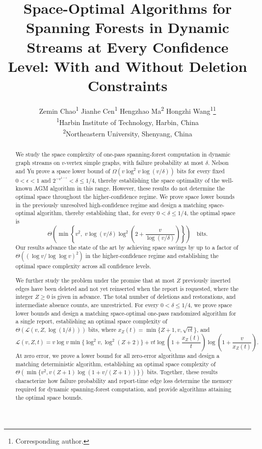 \documentclass[11pt,letterpaper]{article}
\title{Space-Optimal Algorithms for Spanning Forests in Dynamic Streams at Every Confidence Level: With and Without Deletion Constraints}
\author{%
  Zemin Chao\textsuperscript{1}\quad
  Jianhe Cen\textsuperscript{1}\quad
  Hengzhao Ma\textsuperscript{2}\quad
  Hongzhi Wang\textsuperscript{1}\thanks{Corresponding author.}\\[0.6em]
  \small\textsuperscript{1}Harbin Institute of Technology, Harbin, China\\
  \small\textsuperscript{2}Northeastern University, Shenyang, China}
\date{}
\numberwithin{equation}{section}
\begin{document}
\maketitle
\thispagestyle{empty}


\begin{abstract}
We study the space complexity of one-pass spanning-forest computation in dynamic graph streams on $v$-vertex simple graphs, with failure probability at most $\delta$.
Nelson and Yu prove a space lower bound of $\Omega(v\log^2 v\log(v/\delta))$ bits for every fixed
$0<\epsilon<1$ and $2^{-v^{1-\epsilon}}<\delta\le1/4$, thereby establishing the space optimality of the well-known AGM algorithm in this range.
However, these results do not determine the optimal space throughout the higher-confidence regime.
We prove space lower bounds in the previously unresolved high-confidence regime and design a matching space-optimal algorithm, thereby establishing that, for every $0<\delta\le1/4$, the optimal space is
\[
\Theta\!\left(
  \min\left\{
    v^2,\;
    v\log(v/\delta)
    \log^2\!\left(2+\frac{v}{\log(v/\delta)}\right)
  \right\}
\right)
\quad\text{bits}.
\]
Our results advance the state of the art by achieving space savings by up to a factor of $\Theta((\log v/\log\log v)^2)$ in the higher-confidence regime and establishing the optimal space complexity across all confidence levels.

We further study the problem under the promise that at most $Z$ previously inserted edges have been deleted and not yet reinserted when the report is requested, where the integer $Z\ge0$ is given in advance.
The total number of deletions and restorations, and intermediate absence counts, are unrestricted.
For every $0<\delta\le1/4$, we prove space lower bounds and design a matching space-optimal one-pass randomized algorithm for a single report, establishing an optimal space complexity of $\Theta(\mathcal L(v,Z,\log(1/\delta)))$ bits, where $x_Z(t)=\min\{Z+1,v,\sqrt{vt}\}$, and
\[
\mathcal L(v,Z,t)=v\log v\min\{\log^2v,\log^2(Z+2)\}
 +vt\log\!\left(1+\frac{x_Z(t)}t\right)
      \log\!\left(1+\frac v{x_Z(t)}\right).
\]
At zero error, we prove a lower bound for all zero-error algorithms and design a matching deterministic algorithm, establishing an optimal space complexity of $\Theta(\min\{v^2,v(Z+1)\log(1+v/(Z+1))\})$ bits.
Together, these results characterize how failure probability and report-time edge loss determine the memory required for dynamic spanning-forest computation, and provide algorithms attaining the optimal space bounds.
\end{abstract}
\clearpage
\begingroup
\pagestyle{empty}
\small
\setcounter{tocdepth}{2}
\tableofcontents
\thispagestyle{empty}
\endgroup
\clearpage
{}
\end{document}
